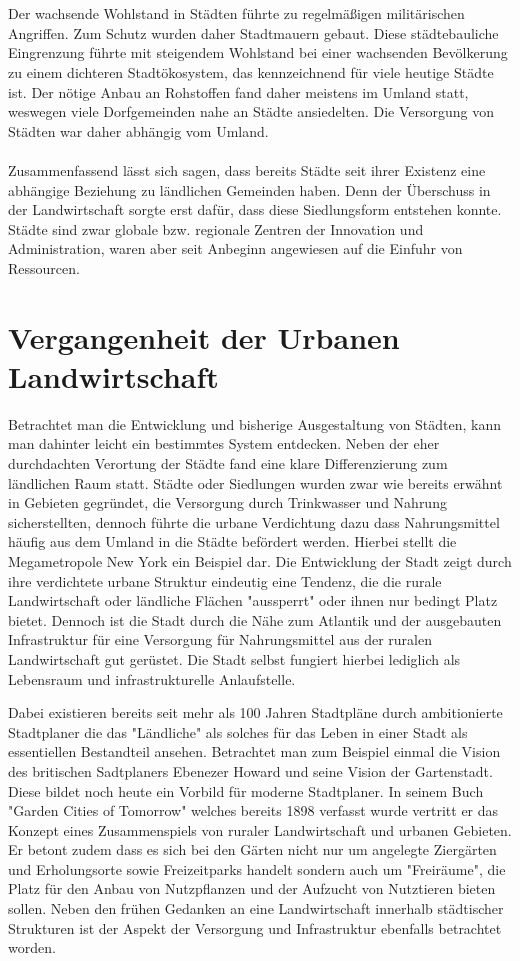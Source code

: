 \documentclass{article}
\begin{document}
\\
\\
Der wachsende Wohlstand in Städten führte zu regelmäßigen militärischen Angriffen. Zum Schutz wurden daher Stadtmauern gebaut. Diese städtebauliche Eingrenzung führte mit steigendem Wohlstand bei einer wachsenden Bevölkerung zu einem dichteren Stadtökosystem, das kennzeichnend für viele heutige Städte ist. Der nötige Anbau an Rohstoffen fand daher meistens im Umland statt, weswegen viele Dorfgemeinden nahe an Städte ansiedelten. Die Versorgung von Städten war daher abhängig vom Umland. 
\\
\\
Zusammenfassend lässt sich sagen, dass bereits Städte seit ihrer Existenz eine abhängige Beziehung zu ländlichen Gemeinden haben. Denn der Überschuss in der Landwirtschaft sorgte erst dafür, dass diese Siedlungsform entstehen konnte. Städte sind zwar globale bzw. regionale Zentren der Innovation und Administration, waren aber seit Anbeginn angewiesen auf die Einfuhr von Ressourcen. 


\section{Vergangenheit der Urbanen Landwirtschaft}

Betrachtet man die Entwicklung und bisherige Ausgestaltung von Städten, kann man dahinter leicht ein bestimmtes System entdecken. Neben der eher durchdachten Verortung der Städte fand eine klare Differenzierung zum ländlichen Raum statt. Städte oder Siedlungen wurden
zwar wie bereits erwähnt in Gebieten gegründet, die Versorgung durch Trinkwasser und Nahrung sicherstellten, dennoch führte die urbane Verdichtung dazu dass Nahrungsmittel häufig aus dem Umland in die Städte befördert werden. Hierbei stellt die Megametropole New York ein Beispiel dar. Die Entwicklung der Stadt zeigt durch ihre verdichtete urbane Struktur eindeutig eine Tendenz, die die rurale Landwirtschaft oder ländliche Flächen "aussperrt" oder ihnen nur bedingt Platz bietet. Dennoch ist die Stadt durch die Nähe zum Atlantik und der ausgebauten Infrastruktur für eine Versorgung für Nahrungsmittel aus der ruralen Landwirtschaft gut gerüstet. Die Stadt selbst fungiert hierbei lediglich als Lebensraum und infrastrukturelle Anlaufstelle.

Dabei existieren bereits seit mehr als 100 Jahren Stadtpläne durch ambitionierte Stadtplaner die das "Ländliche" als solches für das Leben in einer
Stadt als essentiellen Bestandteil ansehen. Betrachtet man zum Beispiel einmal die Vision des britischen Sadtplaners Ebenezer Howard und seine Vision der Gartenstadt. Diese bildet noch heute ein Vorbild für moderne Stadtplaner. In seinem Buch "Garden Cities of Tomorrow" welches bereits 1898 verfasst wurde vertritt er das Konzept eines Zusammenspiels von ruraler Landwirtschaft und urbanen Gebieten. Er betont zudem dass es sich bei den
Gärten nicht nur um angelegte Ziergärten und Erholungsorte sowie Freizeitparks handelt sondern auch um "Freiräume", die Platz für den Anbau von
Nutzpflanzen und der Aufzucht von Nutztieren bieten sollen. Neben den frühen Gedanken an eine Landwirtschaft innerhalb städtischer Strukturen ist der Aspekt der Versorgung und Infrastruktur ebenfalls betrachtet worden.
\end{document}
